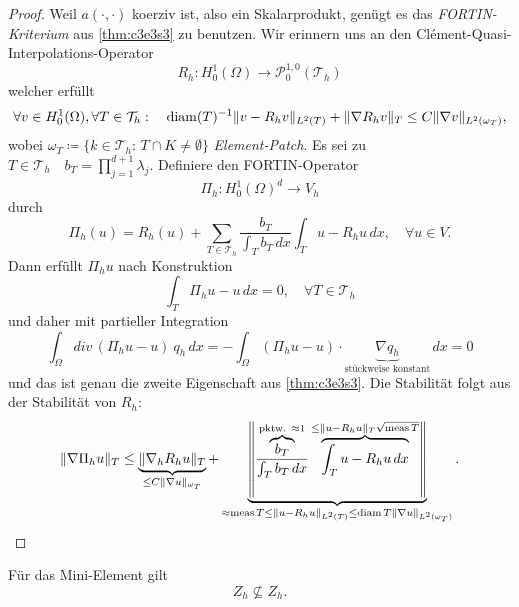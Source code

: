\documentclass[../skript.tex]{subfiles}
\begin{document}
\begin{proof}
	Weil $a(\cdot,\cdot)$ koerziv ist, also ein Skalarprodukt, genügt es das \emph{FORTIN-Kriterium} aus \cref{thm:c3e3s3} zu benutzen. \newline\noindent
	Wir erinnern uns an den Clément-Quasi-Interpolations-Operator
	\[
		R_h:H^1_0(\Omega)\to\mathcal{P}^{1,0}_0(\mathcal{T}_h)
	\]
	welcher erfüllt
	\[
		\forall v\in H^1_0(\Omega),\forall T\in\mathcal{T}_h:\quad \operatorname*{diam} (T)^{-1}\|v-R_hv\|_{L^2(T)} + \|\nabla R_h v\|_T \leq C\|\nabla v\|_{L^2(\omega_T)},
	\]
	wobei $\omega_T \coloneqq \{ k\in\mathcal{T}_h:\,T\cap K\not=\emptyset\}$ \emph{Element-Patch}.\newline\noindent
	Es sei zu $T\in\mathcal{T}_h\quad b_T= \prod_{j=1}^{d+1}\lambda_j$. Definiere den FORTIN-Operator
	\[
		\Pi_h: H^1_0(\Omega)^d \to V_h
	\] 
	durch
	\[
		\Pi_h(u) = R_h(u) + \sum_{T\in\mathcal{T}_h} \frac{b_T}{\int_T b_T\,dx}\int_T u-R_h u\,dx,\quad\forall u\in V.
	\]
	Dann erfüllt $\Pi_hu$ nach Konstruktion
	\[
		\int_T \Pi_h u - u\,dx = 0,\quad\forall T\in\mathcal{T}_h
	\]
	und daher mit partieller Integration
	\[
		\int_\Omega div\,(\Pi_hu-u)\:q_h\,dx = -\int_\Omega (\Pi_hu - u)\cdot\underbrace{\nabla q_h}_{\text{stückweise konstant}}\,dx = 0
	\]
	und das ist genau die zweite Eigenschaft aus \cref{thm:c3e3s3}. Die Stabilität folgt aus der Stabilität von $R_h$:
	\[
		\|\nabla\Pi_h u\|_T\leq 
		\underbrace
		{
			\|\nabla_h R_h u\|_T}_{\leq C\|\nabla u\|
			_
			{\omega_T}
		} 
		+
		\underbrace
		{ 
			\left\| 
				\frac
				{
					\overbrace
					{
						b_T
					}
						^
					{
						\text{pktw. }\approx1
					}
				}
				{
					\int_T b_T\,dx
				} 
				\overbrace
				{
					\int_T u-R_hu\,dx
				}
					^
				{
					\leq\|u-R_hu\|_T\sqrt{\operatorname{meas} T}
				} 
			\right\|
		}
			_
		{
			\approx \operatorname{meas} T\leq \|u-R_hu\|_{L^2(T)}\leq\operatorname*{diam} T\|\nabla u\|_{L^2(\omega_T)}
		}.
	\]
\end{proof}
Für das Mini-Element gilt
\[
	Z_h\not\subseteq Z_h.
\]
\end{document}
